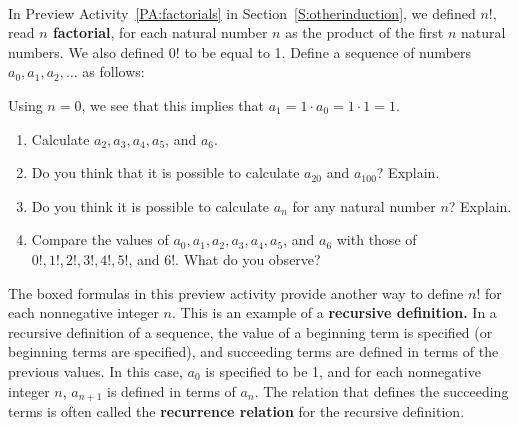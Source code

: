 \begin{previewactivity} \label{PA:factorialsandrecur} \hfill \\
In Preview Activity~\ref{PA:factorials} in Section~\ref{S:otherinduction}, we defined  $n!$, read  \textbf{$n$  factorial}, \label{factorial2}
%
 for each natural number  $n$  as the product of the first  $n$  natural numbers.  
We also defined  $0!$  to be equal to 1.  Define a sequence of numbers  $a_0 ,a_1 ,a_2 , \ldots $  as follows:
%
\begin{center}
\end{center}
%
\vskip10pt
\noindent
Using $n=0$, we see that this implies that $a_1 =1 \cdot a_0 = 1 \cdot 1 = 1$\!.

\begin{enumerate}
\item Calculate  $a_2, a_3, a_4, a_5$, and $a_6 $.

\item Do you think that it is possible to calculate  $a_{20} $ and  $a_{100} $\!?  Explain.

\item Do you think it is possible to calculate  $a_n $ for any natural number  $n$?  Explain.

\item Compare the values of  $a_0 ,a_1 ,a_2 ,a_3 ,a_4 ,a_5$, and $a_6 $ with those of  \\$0!,1!,2!,3!,4!,5!$, and $6!$.  What do you observe?
\end{enumerate}

The boxed formulas in this preview activity provide another way to define  $n!$  for each nonnegative integer  $n$.  This is an example of a \textbf{recursive definition.}
%
%
    In a recursive definition of a sequence, the value of a beginning term is specified (or beginning terms are specified), and succeeding terms are defined in terms of the previous values.  In this case,  $a_0 $  is specified to be 1, and  for each nonnegative integer  $n$,  $a_{n + 1} $  is defined in terms of  $a_n $.  The relation that defines the succeeding terms is often called the \textbf{recurrence relation}
%
 for the recursive definition.

\end{previewactivity}
